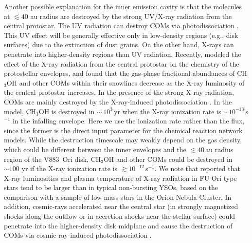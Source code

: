 \documentclass[twocolumn, twocolappendix, astrosymb, times]{aastex631}
\newcommand{\methanol}{CH$_3$OH\xspace}
\begin{document}
Another possible explanation for the inner emission cavity is that the molecules at $\lesssim40$ au radius are destroyed by the strong UV/X-ray radiation from the central protostar. The UV radiation can destroy COMs via photodissociation \citep[e.g.,][]{Garrod2006, Oberg2009}. This UV effect will be generally effective only in low-density regions (e.g., disk surfaces) due to the 
extinction of dust grains.
On the other hand, X-rays can penetrate into higher-density regions than UV radiation.
Recently, \citet{Notsu2021} modeled the effect of the X-ray radiation from the central protostar on the chemistry of the protostellar envelopes, and found that the gas-phase fractional abundances of \methanol and other COMs within their snowlines decrease as the X-ray luminosity of the central protostar increases. In the presence of the strong X-ray radiation, COMs are mainly destroyed by the X-ray-induced photodissociation \citep[e.g.,][]{Garrod2006, Taquet2016, Notsu2021}. 
In the \citet{Notsu2021} model, \methanol is destroyed in $\sim\,10^3$\,yr when the X-ray ionization rate is $\sim10^{-13}$\,s$^{-1}$ in the infalling envelope. Here we use the ionization rate rather than the flux, since the former is the direct input parameter for the chemical reaction network models. While the destruction timescale may weakly depend on the gas density, which could be different between the inner envelopes and the $\lesssim40$\,au radius region of the V883~Ori disk, \methanol and other COMs could be destroyed in $\sim100$ yr if the X-ray ionization rate is $\gtrsim 10^{-12}$\,s$^{-1}$.
We note that \citet{Kuhn2019} reported that X-ray luminosities and plasma temperature of X-ray radiation in FU Ori type stars tend to be larger than in typical non-bursting YSOs, based on the comparison with a sample of low-mass stars in the Orion Nebula Cluster.
In addition, cosmic-rays accelerated near the central star (in strongly magnetized shocks along the outflow or in accretion shocks near the stellar surface) could penetrate into the higher-density disk midplane and cause the destruction of COMs via cosmic-ray-induced photodissociation \citep[e.g.,][]{Padovani2020, Cabedo2023}.

\end{document}
